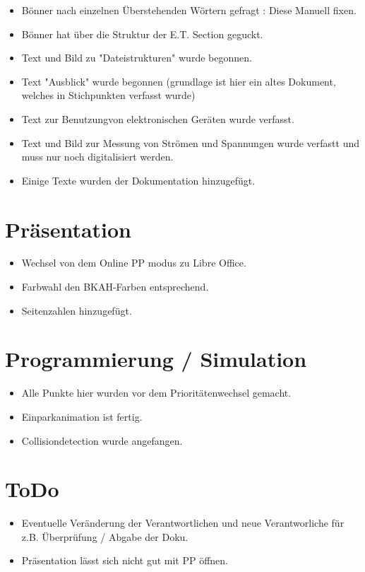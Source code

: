 \documentclass{article}
\begin{document}
\begin{itemize}

\item B\"{o}nner nach einzelnen \"{U}berstehenden W\"{o}rtern gefragt : Diese Manuell fixen.

\item B\"{o}nner hat \"{u}ber die Struktur der E.T. Section geguckt.

\item Text und Bild zu "Dateistrukturen" wurde begonnen.

\item Text "Ausblick" wurde begonnen (grundlage ist hier ein altes Dokument, welches in Stichpunkten verfasst wurde)

\item Text zur Benutzungvon elektronischen Ger\"{a}ten wurde verfasst.

\item Text und Bild zur Messung von Str\"{o}men und Spannungen wurde verfastt und muss nur noch digitalisiert werden.

\item Einige Texte wurden der Dokumentation hinzugef\"{u}gt.

\end{itemize}

\section{Pr\"{a}sentation}

\begin{itemize}

\item Wechsel von dem Online PP modus zu Libre Office.

\item Farbwahl den BKAH-Farben entsprechend.

\item Seitenzahlen hinzugef\"{u}gt.

\end{itemize}

\section{Programmierung  / Simulation}

\begin{itemize}

\item Alle Punkte hier wurden vor dem Priorit\"{a}tenwechsel gemacht.

\item Einparkanimation ist fertig.

\item Collisiondetection wurde angefangen.

\end{itemize}

\section{ToDo}

\begin{itemize}

\item Eventuelle Ver\"{a}nderung der Verantwortlichen und neue Verantworliche f\"{u}r z.B. \"{U}berpr\"{u}fung / Abgabe der Doku.

\item Pr\"{a}sentation l\"{a}sst sich nicht gut mit PP \"{o}ffnen.

\end{itemize}
\end{document}
